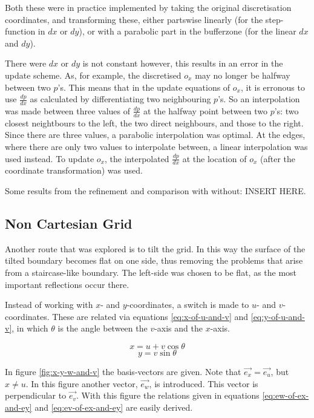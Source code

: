 \documentclass{article}
\begin{document}
Both these were in practice implemented by taking the original discretisation coordinates,
and transforming these, either partswise linearly (for the step-function in \(dx\) or \(dy\)),
or with a parabolic part in the bufferzone (for the linear \(dx\) and \(dy\)).

There were \(dx\) or \(dy\) is not constant however, 
this results in an error in the update scheme.
As, for example, the discretised \(o_x\) may no longer be halfway between two \(p\)'s.
This means that in the update equations of \(o_x\),
it is erronous to use \(\frac{dp}{dx}\) as calculated by differentiating two neighbouring \(p\)'s.
So an interpolation was made between three values of \(\frac{dp}{dx}\) at the halfway point between two \(p\)'s: 
two closest neightbours to the left, 
the two direct neighbours, and those to the right.
Since there are three values, 
a parabolic interpolation was optimal.
At the edges, 
where there are only two values to interpolate between,
a linear interpolation was used instead.
To update \(o_x\), 
the interpolated \(\frac{dp}{dx}\) at the location of \(o_x\) (after the coordinate transformation) was used.

Some results from the refinement and comparison with without: INSERT HERE. %

\subsection{Non Cartesian Grid}

Another route that was explored is to tilt the grid.
In this way the surface of the tilted boundary becomes flat on one side,
thus removing the problems that arise from a staircase-like boundary.
The left-side was chosen to be flat, as the most important reflections occur there.

Instead of working with \(x\)- and \(y\)-coordinates, 
a switch is made to \(u\)- and \(v\)-coordinates. 
These are related via equations \ref{eq:x-of-u-and-v} and \ref{eq:y-of-u-and-v}, 
in which \(\theta\) is the angle between the \(v\)-axis and the \(x\)-axis.

\begin{equation}\label{eq:x-of-u-and-v}
    x = u + v \cos \theta
\end{equation}
\begin{equation}\label{eq:y-of-u-and-v}
    y = v \sin \theta
\end{equation}

In figure \ref{fig:x-y-w-and-v} the basis-vectors are given. %
Note that \(\vec{e_x} = \vec{e_u}\), but \(x \ne u\). 
In this figure another vector, \(\vec{e_w}\), is introduced.
This vector is perpendicular to \(\vec{e_v}\).
With this figure the relations given in equations \ref{eq:ew-of-ex-and-ey} and \ref{eq:ev-of-ex-and-ey} are easily derived.
\end{document}
